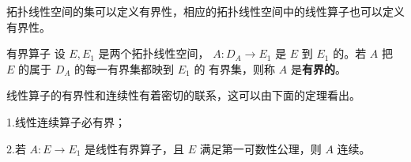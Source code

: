 
\begin{issues}
\issueDraft
\end{issues}

拓扑线性空间的集可以定义有界性，相应的拓扑线性空间中的线性算子也可以定义有界性。

\begin{definition}{有界算子}
设 $E,E_1$ 是两个拓扑线性空间， $A:D_A\rightarrow E_1$ 是 $E$ 到 $E_1$ 的。若 $A$ 把 $E$ 的属于 $D_A$ 的每一有界集都映到 $E_1$ 的 有界集，则称 $A$ 是\textbf{有界的}。
\end{definition}

线性算子的有界性和连续性有着密切的联系，这可以由下面的定理看出。

\begin{theorem}{}
1.线性连续算子必有界；

2.若 $A:E\rightarrow E_1$ 是线性有界算子，且 $E$ 满足第一可数性公理，则 $A$ 连续。
\end{theorem}



